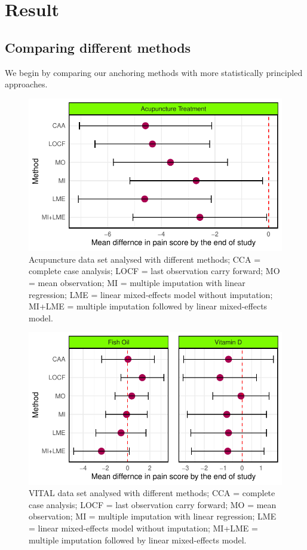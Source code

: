 \documentclass{article}
\newcommand{\pandocbounded}[1]{#1}
\begin{document}
\newpage

\section{Result}\label{result}

\subsection{Comparing different
methods}\label{comparing-different-methods}

We begin by comparing our anchoring methods with more statistically
principled approaches.

\begin{figure}
\centering
\pandocbounded{\includegraphics[keepaspectratio]{Final_Report_files/figure-latex/unnamed-chunk-25-1.pdf}}
\caption{Acupuncture data set analysed with different methods; CCA =
complete case analysis; LOCF = last observation carry forward; MO = mean
observation; MI = multiple imputation with linear regression; LME =
linear mixed-effects model without imputation; MI+LME = multiple
imputation followed by linear mixed-effects model.}
\end{figure}

\begin{figure}
\centering
\pandocbounded{\includegraphics[keepaspectratio]{Final_Report_files/figure-latex/unnamed-chunk-26-1.pdf}}
\caption{VITAL data set analysed with different methods; CCA = complete
case analysis; LOCF = last observation carry forward; MO = mean
observation; MI = multiple imputation with linear regression; LME =
linear mixed-effects model without imputation; MI+LME = multiple
imputation followed by linear mixed-effects model.}
\end{figure}
\end{document}
